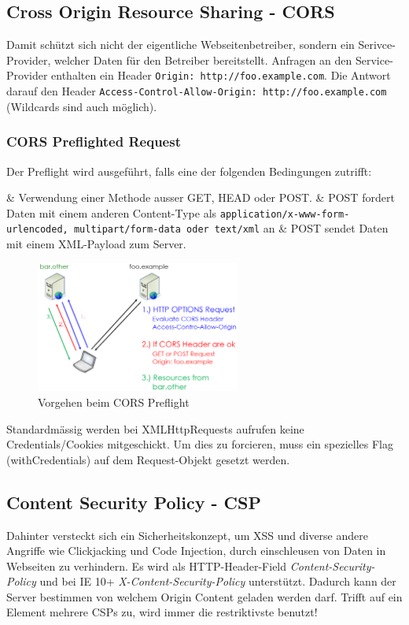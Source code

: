 \subsection{Cross Origin Resource Sharing - CORS}
Damit schützt sich nicht der eigentliche Webseitenbetreiber, sondern ein Serivce-Provider, welcher Daten für den Betreiber bereitstellt. Anfragen an den Service-Provider enthalten ein Header \lstinline|Origin: http://foo.example.com|. Die Antwort darauf den Header \lstinline|Access-Control-Allow-Origin: http://foo.example.com| (Wildcards sind auch möglich).

\subsubsection{CORS Preflighted Request}

Der Preflight wird ausgeführt, falls eine der folgenden Bedingungen zutrifft:
\begin{easylist}[itemize]
	& Verwendung einer Methode ausser GET, HEAD oder POST.
	& POST fordert Daten mit einem anderen Content-Type als \lstinline|application/x-www-form-urlencoded, multipart/form-data oder text/xml| an
	& POST sendet Daten mit einem XML-Payload zum Server.
\end{easylist}

\begin{figure}[H]
	\centering
	\includegraphics[width=0.6\textwidth]{./img/cors-preflight}
	\caption{Vorgehen beim CORS Preflight}
\end{figure}

Standardmässig werden bei XMLHttpRequests aufrufen keine Credentials/Cookies mitgeschickt. Um dies zu forcieren, muss ein spezielles Flag (withCredentials) auf dem Request-Objekt gesetzt werden.

\subsection{Content Security Policy - CSP}
Dahinter versteckt sich ein Sicherheitskonzept, um XSS und diverse andere Angriffe wie Clickjacking und Code Injection, durch einschleusen von Daten in Webseiten zu verhindern. Es wird als HTTP-Header-Field \textit{Content-Security-Policy} und bei IE 10+ \textit{X-Content-Security-Policy} unterstützt.
Dadurch kann der Server bestimmen von welchem Origin Content geladen werden darf. Trifft auf ein Element mehrere CSPs zu, wird immer die restriktivste benutzt!

